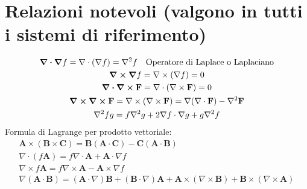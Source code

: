 \documentclass[a4paper]{scrarticle}
\begin{document}
\section {Relazioni notevoli (valgono in tutti i sistemi di riferimento)}
\begin{gather}
\div  \grad f = \nabla \cdot (\nabla f) = \nabla^2 f \quad\text{Operatore di Laplace o Laplaciano}\\
\curl \grad f = \nabla \times (\nabla f) = 0\\
\div  \curl \mathbf{F} = \nabla \cdot (\nabla \times \mathbf{F}) = 0\\
\curl \curl \mathbf{F} = \nabla \times (\nabla \times \mathbf{F}) = \nabla (\nabla \cdot \mathbf{F}) - \nabla^2 \mathbf{F}\\
\nabla^2 f g = f \nabla^2 g + 2 \nabla f \cdot \nabla g + g \nabla^2 f
\end{gather}
Formula di Lagrange per prodotto vettoriale: 
\begin{gather}
\mathbf{A} \times (\mathbf{B} \times \mathbf{C}) = \mathbf{B} (\mathbf{A} \cdot \mathbf{C}) - \mathbf{C} (\mathbf{A} \cdot \mathbf{B})\\
\nabla\cdot(f \mathbf A)=f \nabla\cdot\mathbf A+\mathbf A\cdot\nabla f\\
\nabla\times f \mathbf A= f \nabla\times \mathbf A-\mathbf A\times \nabla f\\
\nabla ( \mathbf{A} \cdot \mathbf{B} ) 
  = ( \mathbf{A} \cdot \nabla ) \mathbf{B}
  + ( \mathbf{B} \cdot \nabla ) \mathbf{A}
  + \mathbf{A} \times ( \nabla \times \mathbf{B} )
  + \mathbf{B} \times ( \nabla \times \mathbf{A} )
\end{gather}
\end{document}
